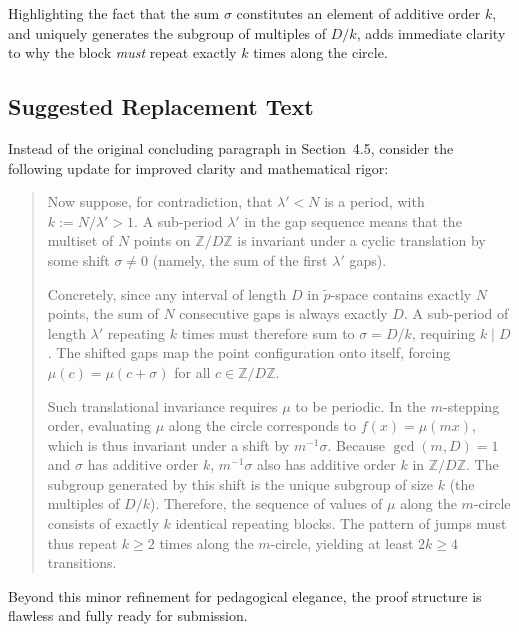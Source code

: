 \documentclass[11pt]{article}
\begin{document}
Highlighting the fact that the sum $\sigma$ constitutes an element of additive order $k$, and uniquely generates the subgroup of multiples of $D/k$, adds immediate clarity to why the block \textit{must} repeat exactly $k$ times along the circle.

\subsection{Suggested Replacement Text}

Instead of the original concluding paragraph in Section~4.5, consider the following update for improved clarity and mathematical rigor:

\begin{quote}
Now suppose, for contradiction, that $\lambda' < N$ is a period, with $k := N/\lambda' > 1$. A sub-period $\lambda'$ in the gap sequence means that the multiset of $N$ points on $\mathbb{Z}/D\mathbb{Z}$ is invariant under a cyclic translation by some shift $\sigma \ne 0$ (namely, the sum of the first $\lambda'$ gaps).

Concretely, since any interval of length $D$ in $\tilde{p}$-space contains exactly $N$ points, the sum of $N$ consecutive gaps is always exactly $D$. A sub-period of length $\lambda'$ repeating $k$ times must therefore sum to $\sigma = D/k$, requiring $k \mid D$. The shifted gaps map the point configuration onto itself, forcing $\mu(c) = \mu(c + \sigma)$ for all $c \in \mathbb{Z}/D\mathbb{Z}$.

Such translational invariance requires $\mu$ to be periodic. In the $m$-stepping order, evaluating $\mu$ along the circle corresponds to $f(x) = \mu(mx)$, which is thus invariant under a shift by $m^{-1}\sigma$. Because $\gcd(m,D)=1$ and $\sigma$ has additive order $k$, $m^{-1}\sigma$ also has additive order $k$ in $\mathbb{Z}/D\mathbb{Z}$. The subgroup generated by this shift is the unique subgroup of size $k$ (the multiples of $D/k$). Therefore, the sequence of values of $\mu$ along the $m$-circle consists of exactly $k$ identical repeating blocks. The pattern of jumps must thus repeat $k \ge 2$ times along the $m$-circle, yielding at least $2k \ge 4$ transitions.
\end{quote}

Beyond this minor refinement for pedagogical elegance, the proof structure is flawless and fully ready for submission.
\end{document}
